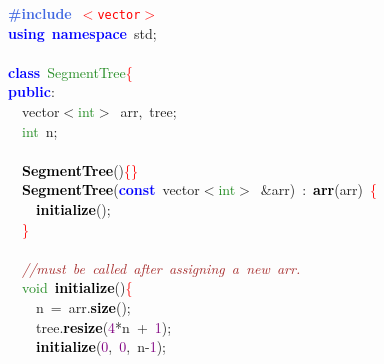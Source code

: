 {\ttfamily \raggedright {
\noindent
\mbox{}\textbf{\textcolor{RoyalBlue}{\#include}}\ \texttt{\textcolor{Red}{$<$vector$>$}} \\
\mbox{}\textbf{\textcolor{Blue}{using}}\ \textbf{\textcolor{Blue}{namespace}}\ std\textcolor{BrickRed}{;} \\
\mbox{} \\
\mbox{}\textbf{\textcolor{Blue}{class}}\ \textcolor{ForestGreen}{SegmentTree}\textcolor{Red}{\{} \\
\mbox{}\textbf{\textcolor{Blue}{public}}\textcolor{BrickRed}{:} \\
\mbox{}\ \ vector\textcolor{BrickRed}{$<$}\textcolor{ForestGreen}{int}\textcolor{BrickRed}{$>$}\ arr\textcolor{BrickRed}{,}\ tree\textcolor{BrickRed}{;} \\
\mbox{}\ \ \textcolor{ForestGreen}{int}\ n\textcolor{BrickRed}{;} \\
\mbox{} \\
\mbox{}\ \ \textbf{\textcolor{Black}{SegmentTree}}\textcolor{BrickRed}{()}\textcolor{Red}{\{\}} \\
\mbox{}\ \ \textbf{\textcolor{Black}{SegmentTree}}\textcolor{BrickRed}{(}\textbf{\textcolor{Blue}{const}}\ vector\textcolor{BrickRed}{$<$}\textcolor{ForestGreen}{int}\textcolor{BrickRed}{$>$}\ \textcolor{BrickRed}{\&}arr\textcolor{BrickRed}{)}\ \textcolor{BrickRed}{:}\ \textbf{\textcolor{Black}{arr}}\textcolor{BrickRed}{(}arr\textcolor{BrickRed}{)}\ \textcolor{Red}{\{} \\
\mbox{}\ \ \ \ \textbf{\textcolor{Black}{initialize}}\textcolor{BrickRed}{();} \\
\mbox{}\ \ \textcolor{Red}{\}} \\
\mbox{} \\
\mbox{}\ \ \textit{\textcolor{Brown}{//must\ be\ called\ after\ assigning\ a\ new\ arr.}} \\
\mbox{}\ \ \textcolor{ForestGreen}{void}\ \textbf{\textcolor{Black}{initialize}}\textcolor{BrickRed}{()}\textcolor{Red}{\{} \\
\mbox{}\ \ \ \ n\ \textcolor{BrickRed}{=}\ arr\textcolor{BrickRed}{.}\textbf{\textcolor{Black}{size}}\textcolor{BrickRed}{();} \\
\mbox{}\ \ \ \ tree\textcolor{BrickRed}{.}\textbf{\textcolor{Black}{resize}}\textcolor{BrickRed}{(}\textcolor{Purple}{4}\textcolor{BrickRed}{*}n\ \textcolor{BrickRed}{+}\ \textcolor{Purple}{1}\textcolor{BrickRed}{);} \\
\mbox{}\ \ \ \ \textbf{\textcolor{Black}{initialize}}\textcolor{BrickRed}{(}\textcolor{Purple}{0}\textcolor{BrickRed}{,}\ \textcolor{Purple}{0}\textcolor{BrickRed}{,}\ n\textcolor{BrickRed}{-}\textcolor{Purple}{1}\textcolor{BrickRed}{);} \\
}}
